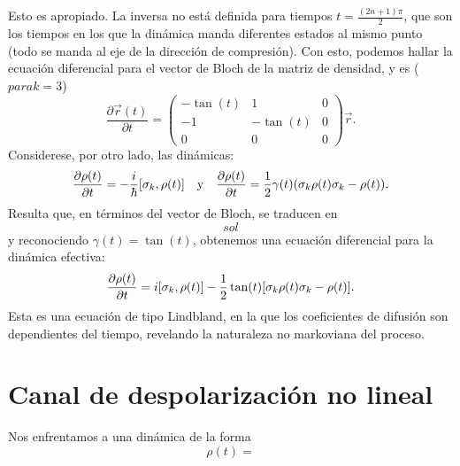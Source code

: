 Esto es apropiado. La inversa no está definida para tiempos $t=\frac{(2n+1)\pi}{2}$, que son los tiempos en los que la dinámica manda diferentes estados al mismo punto (todo se manda al eje de la dirección de compresión). Con esto, podemos hallar la ecuación diferencial para el vector de Bloch de la matriz de densidad, y es ($para k=3$)
\begin{equation*}
    \frac{\partial \vec{r}(t)}{\partial t}= \begin{pmatrix}
        -\tan(t) & 1 & 0 \\
        -1 & -\tan(t) & 0 \\
        0 & 0 & 0
     \end{pmatrix}\vec{r}.
\end{equation*}
Considerese, por otro lado, las dinámicas:
\begin{align*}
    \frac{\partial \rho(t)}{\partial t}=-\frac{i}{\hbar}[\sigma_{k},\rho(t)]& & \text{y} & & \frac{\partial \rho(t)}{\partial t}=\frac{1}{2}\gamma(t)\qty(\sigma_{k}\rho(t)\sigma_{k}-\rho(t)).
\end{align*}
Resulta que, en términos del vector de Bloch, se traducen en 
\begin{equation*}
    sol
\end{equation*}
y reconociendo $\gamma(t)=\tan(t)$, obtenemos una ecuación diferencial para la dinámica efectiva:
\begin{equation*}
    \frac{\partial \rho(t)}{\partial t}=i[\sigma_{k},\rho(t)]-\frac{1}{2}\tan(t)\qty[\sigma_{k}\rho(t)\sigma_{k}-\rho(t)].
\end{equation*}
Esta es una ecuación de tipo Lindbland, en la que los coeficientes de difusión son dependientes del tiempo, revelando la naturaleza no markoviana del proceso.
\section{Canal de despolarización no lineal}
Nos enfrentamos a una dinámica de la forma 
\begin{equation*}
    \rho(t)=
\end{equation*}